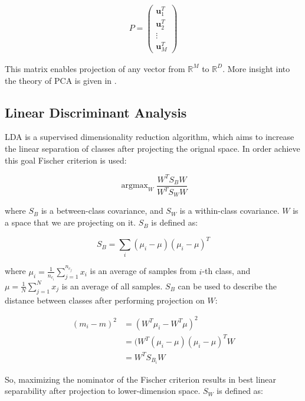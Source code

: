 \documentclass[a4paper, 10 pt, conference]{ieeeconf}
\newcommand{\bb}{\textbf}
\DeclareMathOperator*{\argmax}{argmax}
\begin{document}
\begin{align}
	P =
	\left( \begin{array}{l}
		\bb{u}_1^T \\
		\bb{u}_2^T \\
		\vdots	 \\
		\bb{u}_M^T
	\end{array} \right)
\end{align}

This matrix enables projection of any vector from $\mathbb{R}^M$ to $\mathbb{R}^D$.
More insight into the theory of PCA is given in \cite{Pattern_recognition}.

\subsection{Linear Discriminant Analysis}

LDA is a supervised dimensionality reduction algorithm, which aims to increase the linear separation of classes after projecting the orignal space. In order achieve this goal Fischer criterion is used:

\begin{equation}
    \argmax_{W} \frac{W^{T} S_{B} W}{W^{T} S_{W} W}
    \label{eq:Fischer_criterion}
\end{equation}

where $S_{B}$ is a between-class covariance, and $S_{W}$ is a within-class covariance. $W$ is a space that we are projecting on it. $S_{B}$ is defined as:

\begin{equation}
    S_B = \sum_{i} (\mu_{i} - \mu)(\mu_{i} - \mu)^{T}
\end{equation}

where $\mu_i = \frac{1}{n_{c_i}} \sum_{j=1}^{n_{c_j}} x_i$ is an average of samples from $i$-th class, and $\mu = \frac{1}{N} \sum_{j=1}^{N} x_j$ is an average of all samples. $S_B$ can be used to describe the distance between classes after performing projection on $W$:

\begin{align}
    (m_i - m)^2 &= (W^T \mu_i - W^T \mu)^2 \nonumber \\
                &= (W^T (\mu_i - \mu)(\mu_i - \mu)^T W \\
                &= W^T S_{B_i} W \nonumber
\end{align}

So, maximizing the nominator of the Fischer criterion results in best linear separability after projection to lower-dimension space.
$S_{W}$ is defined as:
\end{document}

